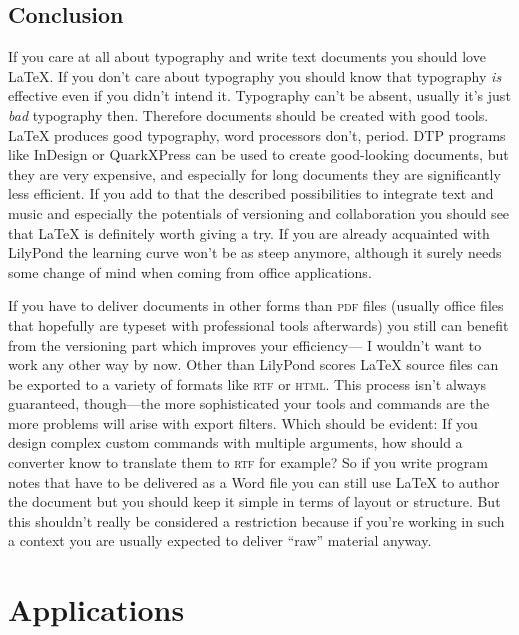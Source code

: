 \documentclass[DIV=12]{scrreprt}
\begin{document}
\section{Conclusion}
\label{sec:pt_latex-conclusion}

If you care at all about typography and write text documents you should love \LaTeX. 
If you don't care about typography you should know that typography \emph{is} effective even if you didn't intend it.
Typography can't be absent, usually it's just \emph{bad} typography then.
Therefore documents should be created with good tools.
\LaTeX{} produces good typography, word processors don't, period.
DTP programs like InDesign\texttrademark{} or QuarkXPress\texttrademark{} can be used to create good-looking documents, but they are very expensive, and especially for long documents they are significantly less efficient.
If you add to that the described possibilities to integrate text and music and especially the potentials of versioning and collaboration you should see that \LaTeX{} is definitely worth giving a try.
If you are already acquainted with LilyPond the learning curve won't be as steep anymore, although it surely needs some change of mind when coming from office applications.

If you have to deliver documents in other forms than \textsc{pdf} files (usually office files that hopefully are typeset with professional tools afterwards) you still can benefit from the versioning part which improves your efficiency---
I wouldn't want to work any other way by now.
Other than LilyPond scores \LaTeX{} source files can be exported to a variety of formats like \textsc{rtf} or \textsc{html}.
This process isn't always guaranteed, though---the more sophisticated your tools and commands are the more problems will arise with export filters.
Which should be evident: If you design complex custom commands with multiple arguments, how should a converter know to translate them to \textsc{rtf} for example?
So if you write program notes that have to be delivered as a Word file you can still use \LaTeX{} to author the document but you should keep it simple in terms of layout or structure.
But this shouldn't really be considered a restriction because if you're working in such a context you are usually expected to deliver “raw” material anyway.

\chapter{Applications}
\label{chap:pt_applications}
\end{document}
